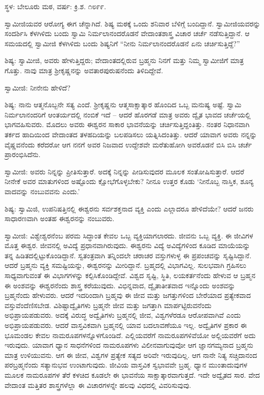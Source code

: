 \centerline{ಸ್ಥಳ: ಬೇಲೂರು ಮಠ, ವರ್ಷ: ಕ್ರಿ.ಶ. ೧೮೯೯.}

ಸ್ವಾಮೀಜಿಯವರ ಆರೋಗ್ಯ ಈಗ ಚೆನ್ನಾಗಿದೆ. ಶಿಷ್ಯ ಮಠಕ್ಕೆ ಒಂದು ಶನಿವಾರ ಬೆಳಿಗ್ಗೆ ಬಂದಿದ್ದಾನೆ. ಸ್ವಾಮೀಜಿಯವರನ್ನು ಸಂದರ್ಶಿಸಿ ಕೆಳಗಿಳಿದು ಬಂದು ಸ್ವಾಮಿ ನಿರ್ಮಲಾನಂದರೊಡನೆ ವೇದಾಂತಶಾಸ್ತ್ರ ವಿಚಾರ ಚರ್ಚೆ ನಡೆಸುತ್ತಿದ್ದಾನೆ. ಆ ಸಮಯದಲ್ಲಿ ಸ್ವಾಮೀಜಿ ಕೆಳಗಿಳಿದು ಬಂದು ಶಿಷ್ಯನಿಗೆ “ನೀನು ನಿರ್ಮಲಾನಂದರೊಡನೆ ಏನು ಚರ್ಚಿಸುತ್ತಿದ್ದೆ?”

ಶಿಷ್ಯ: ಸ್ವಾಮೀಜಿ, ಅವರು ಹೇಳುತ್ತಿದ್ದರು; ವೇದಾಂತದಲ್ಲಿರುವ ಬ್ರಹ್ಮನು ನಿನಗೆ ಮತ್ತು ನಿಮ್ಮ ಸ್ವಾಮೀಜಿಗೆ ಮಾತ್ರ ಗೊತ್ತು. ನಾವು ಮಾತ್ರ ಶ‍್ರೀಕೃಷ್ಣನನ್ನು ಅವತಾರಪುರುಷನೆಂದು ತಿಳಿದಿದ್ದೇವೆ.

ಸ್ವಾಮೀಜಿ: ನೀನೇನು ಹೇಳಿದೆ?

ಶಿಷ್ಯ: ನಾನು ಆತ್ಮನೊಬ್ಬನೇ ಸತ್ಯ ಎಂದೆ. ಶ‍್ರೀಕೃಷ್ಣನು ಆತ್ಮಸಾಕ್ಷಾತ್ಕಾರ ಹೊಂದಿದ ಒಬ್ಬ ಮನುಷ್ಯ ಅಷ್ಟೆ. ಸ್ವಾಮಿ ನಿರ್ಮಲಾನಂದರಿಗೆ ಆಂತರ್ಯದಲ್ಲಿ ನಂಬಿಕೆ ಇದೆ – ಆದರೆ ಹೊರಗಡೆ ಮಾತ್ರ ಅವರು ದ್ವೈತ ಭಾವದ ಚರ್ಚೆಯಲ್ಲಿ ಭಾಗವಹಿಸುವರು. ಮೊದಲು ಅವರು ಈಶ್ವರನ ಸಾಕಾರ ಭಾವನೆಯನ್ನು ಚರ್ಚಿಸುತ್ತಿದ್ದಂತಿತ್ತು. ನಂತರ ನಿಧಾನವಾಗಿ ತರ್ಕದ ಹಾದಿಯಿಂದ ವೇದಾಂತದ ತಳಹದಿಯನ್ನು ಬಲಪಡಿಸಲು ಯತ್ನಿಸಿದಂತಿತ್ತು. ಆದರೆ ಯಾವಾಗ ಅವರು ನನ್ನನ್ನು ವೈಷ್ಣವನೆಂದು ಕರೆದರೋ ಆಗ ನನಗೆ ಅವರ ನಿಜವಾದ ಉದ್ದೇಶವೇ ಮರೆತುಹೋಗಿ ಅವರೊಡನೆ ಬಿಸಿ ಬಿಸಿ ಚರ್ಚೆ ಪ್ರಾರಂಭಿಸಿದೆನು.

ಸ್ವಾಮೀಜಿ: ಅವರು ನಿನ್ನನ್ನು ಪ್ರೀತಿಸುತ್ತಾರೆ. ಅದಕ್ಕೆ ನಿನ್ನನ್ನು ಪೀಡಿಸುವುದರ ಮೂಲಕ ಸಂತೋಷಿಸುತ್ತಾರೆ. ಆದರೆ ನೀನೇಕೆ ಅವರ ಮಾತುಗಳಿಂದ ಅಷ್ಟೊಂದು ಕ್ಷೋಭೆಗೊಳ್ಳಬೇಕು? ನೀನೂ ಉತ್ತರ ಕೊಡು ‘ನೀನೊಬ್ಬ ನಾಸ್ತಿಕ, ಶೂನ್ಯ ವಾದವನ್ನು ನಂಬುವವನು ಎಂದು.’

ಶಿಷ್ಯ: ಸ್ವಾಮಿಜಿ, ಉಪನಿಷತ್ತಿನಲ್ಲಿ ಈಶ್ವರನು ಸರ್ವಶಕ್ತನಾದ ವ್ಯಕ್ತಿ ಎಂದು ಎಲ್ಲಾದರೂ ಹೇಳಿದೆಯೇ? ಆದರೆ ಜನರು ಸಾಧಾರಣವಾಗಿ ಅಂತಹ ಈಶ್ವರನನ್ನು ನಂಬುವರು.

ಸ್ವಾಮೀಜಿ: ವಿಶ್ವೇಶ್ವರನೆಂಬ ಪರಮ ಸಿದ್ಧಾಂತ ಕೇವಲ ಒಬ್ಬ ವ್ಯಕ್ತಿಯಾಗಲಾರದು. ಜೀವನು ಒಬ್ಬ ವ್ಯಕ್ತಿ. ಈ ಜೀವಿಗಳ ಮೊತ್ತ ಈಶ್ವರ. ಜೀವನಲ್ಲಿ ಅವಿದ್ಯೆ ಪ್ರಧಾನವಾಗಿರುವುದು. ಈಶ್ವರನು ವಿದ್ಯೆ ಅವಿದ್ಯೆಗಳಿಂದ ಕೂಡಿದ ಮಾಯೆಯನ್ನು ತನ್ನ ಹಿಡಿತದಲ್ಲಿಟ್ಟುಕೊಂಡಿದ್ದಾನೆ. ಸ್ವತಂತ್ರವಾಗಿ ತನ್ನಿಂದಲೇ ಚರಾಚರ ವಸ್ತುಗಳುಳ್ಳ ಈ ಪ್ರಪಂಚವನ್ನು ಸೃಷ್ಟಿಸಿದ್ದಾನೆ. ಆದರೆ ಬ್ರಹ್ಮನು ವ್ಯಕ್ತಿ ಸಮಷ್ಟಿಯನ್ನು, ಈಶ್ವರನನ್ನು ಮೀರಿದ್ದಾನೆ. ಬ್ರಹ್ಮದಲ್ಲಿ ವಿಭಾಗವಿಲ್ಲ. ಸುಲಭವಾಗಿ ಗ್ರಹಿಸಲು ಸಾಧ್ಯವಾಗುವಂತೆ ಈ ವಿಭಾಗಗಳನ್ನು ಕಲ್ಪಿಸಿಕೊಂಡಿದ್ದೇವೆ. ವಿಶ್ವದ ಸೃಷ್ಟಿ, ಸ್ಥಿತಿ, ಲಯಕರ್ತನೆಂದು ಹೇಳುವ ಆ ಬ್ರಹ್ಮನ ಈ ಅಂಶವನ್ನು ಈಶ್ವರನೆಂದು ಶಾಸ್ತ್ರ ಕರೆಯುವುದು. ವಿಭಿನ್ನವಾದ, ದ್ವೈತಾತೀತವಾದ ಇನ್ನೊಂದು ಅಂಶವನ್ನು ಬ್ರಹ್ಮನೆಂದು ಹೇಳುವರು. ಆದರೆ ಇದರಿಂದಾಗಿ ಬ್ರಹ್ಮವು ಈ ಜೀವ ಮತ್ತು ಜಗತ್ತುಗಳಿಂದ ಬೇರೆಯಾದ ಪ್ರತ್ಯೇಕವಾದ ವಸ್ತುವೆಂದೆಣಿಸಬೇಡ. ವಿಶಿಷ್ಟಾದ್ವೈತಿಗಳು ಬ್ರಹ್ಮನೇ ಜೀವ ಮತ್ತು ಜಗತ್ತಾಗಿ ಮಾರ್ಪಟ್ಟಿರುವನೆಂದು ಅಭಿಪ್ರಾಯಪಡುವರು. ಅದಕ್ಕೆ ವಿರುದ್ಧ ಅದ್ವೈತಿಗಳು ಬ್ರಹ್ಮನಲ್ಲಿ ಜೀವ, ವಿಶ್ವಗಳೆರಡೂ ಆರೋಪವಾಗಿವೆ ಎಂದು ಅಭಿಪ್ರಾಯಪಡುವರು. ಆದರೆ ವಾಸ್ತವಿಕವಾಗಿ ಬ್ರಹ್ಮನಲ್ಲಿ ಯಾವ ಬದಲಾವಣೆಯೂ ಇಲ್ಲ. ಅದ್ವೈತಿಗಳ ಪ್ರಕಾರ ಈ ಭೂಮಂಡಲ ಕೇವಲ ನಾಮರೂಪಗಳನ್ನೊಳಗೊಂಡಿದೆ. ಎಲ್ಲಿಯವರೆಗೆ ನಾಮರೂಪಗಳಿವೆಯೋ ಅಲ್ಲಿಯವರೆಗೆ ಅದು ಇರುವುದು. ಯಾವಾಗ ಧ್ಯಾನ ಸಾಧನೆಗಳಿಂದ ನಾಮರೂಪಗಳು ವಿಲೀನವಾಗುವುವೋ ಆಗ ಜ್ಞಾನಗಮ್ಯನಾದ ಬ್ರಹ್ಮನು ಮಾತ್ರ ಉಳಿಯುವನು. ಆಗ ಈ ಜೀವ, ವಿಶ್ವಗಳ ಪ್ರತ್ಯೇಕ ಸತ್ಯದ ಅರಿವೇ ಇರುವುದಿಲ್ಲ. ಆಗ ನಾನೇ ನಿತ್ಯ ಸಚ್ಚಿದಾನಂದ ಪರಬ್ರಹ್ಮನೆಂದು ಸತ್ಯಾನುಭವ ಉಂಟಾಗುವುದು. ಜೀವಿಯ ವಾಸ್ತವಿಕ ಸ್ವಭಾವವೇ ಬ್ರಹ್ಮ. ಧ್ಯಾನ ಮುಂತಾದುವುಗಳ ಮೂಲಕ ನಾಮರೂಪಗಳ ತೆರೆ ಕಳಚಿದ ಕೂಡಲೇ ಈ ಭಾವನೆಯ ಸಾಕ್ಷಾತ್ಕಾರವಾಗುತ್ತದೆ. ಇದೇ ಅದ್ವೈತದ ಸಾರ. ವೇದ ವೇದಾಂತ ಮತ್ತಿತರ ಶಾಸ್ತ್ರಗಳೆಲ್ಲಾ ಈ ವಿಚಾರಗಳನ್ನೇ ಹಲವು ವಿಧದಲ್ಲಿ ವಿವರಿಸುವುವು.

